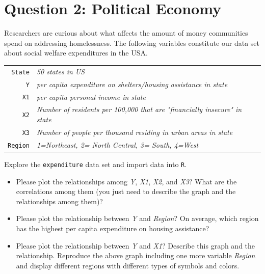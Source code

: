 \documentclass[12pt,letterpaper]{article}
\begin{document}
\newpage

	\section*{Question 2: Political Economy}

\noindent Researchers are curious about what affects the amount of money communities spend on addressing homelessness. The following variables constitute our data set about social welfare expenditures in the USA. \\
\vspace{.5cm}


\begin{tabular}{r|l}
	\texttt{State} &\emph{50 states in US} \\
	\texttt{Y} & \emph{per capita expenditure on shelters/housing assistance in state}\\
	\texttt{X1} &\emph{per capita personal income in state} \\
	\texttt{X2} &  \emph{Number of residents per 100,000 that are "financially insecure" in state}\\
	\texttt{X3} &  \emph{Number of people per thousand residing in urban areas in state} \\
	\texttt{Region} &  \emph{1=Northeast, 2= North Central, 3= South, 4=West} \\
\end{tabular}

\vspace{.5cm}
\noindent Explore the \texttt{expenditure} data set and import data into \texttt{R}.
\vspace{.5cm}
  
\vspace{.5cm}
\begin{itemize}

\item
Please plot the relationships among \emph{Y}, \emph{X1}, \emph{X2}, and \emph{X3}? What are the correlations among them (you just need to describe the graph and the relationships among them)?
\vspace{.5cm}
\item
Please plot the relationship between \emph{Y} and \emph{Region}? On average, which region has the highest per capita expenditure on housing assistance?
\vspace{.5cm}
\item
Please plot the relationship between \emph{Y} and \emph{X1}? Describe this graph and the relationship. Reproduce the above graph including one more variable \emph{Region} and display different regions with different types of symbols and colors.
\end{itemize}
\end{document}
